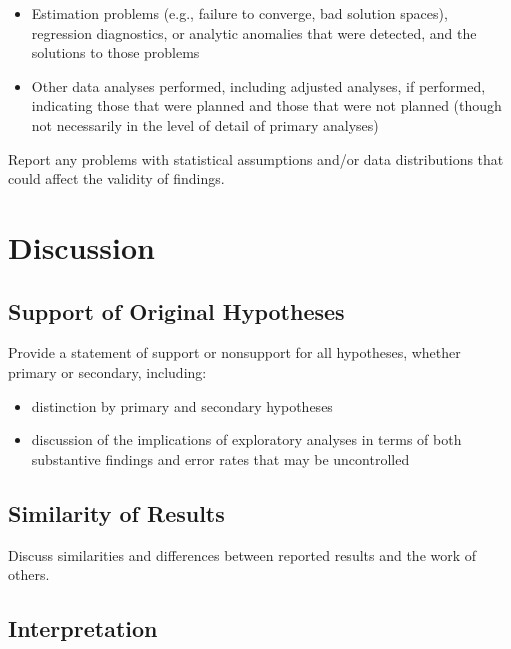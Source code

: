 \documentclass[acmsmall,screen,anonymous,review]{acmart}
\begin{document}
\begin{itemize}
    \begin{itemize}
        \item details of the models estimated
        \item associated variance--covariance (or correlation) matrix or matrices
        \item identification of the statistical software used to run the analyses (e.g., SAS PROC GLM or the particular R package)
    \end{itemize}
    \item Estimation problems (e.g., failure to converge, bad solution spaces), regression diagnostics, or analytic anomalies that were detected, and the solutions to those problems
    \item Other data analyses performed, including adjusted analyses, if performed, indicating those that were planned and those that were not planned (though not necessarily in the level of detail of primary analyses)
\end{itemize}

Report any problems with statistical assumptions and/or data distributions that could affect the validity of findings.


\section{Discussion}
\subsection{Support of Original Hypotheses}
Provide a statement of support or nonsupport for all hypotheses, whether primary or secondary, including:
\begin{itemize}
    \item distinction by primary and secondary hypotheses
    \item discussion of the implications of exploratory analyses in terms of both substantive findings and error rates that may be uncontrolled
\end{itemize}

\subsection{Similarity of Results}
Discuss similarities and differences between reported results and the work of others.

\subsection{Interpretation}
\end{document}
